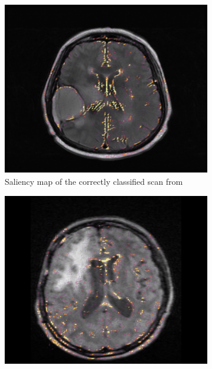 \begin{figure}[htbp]
    \begin{subfigure}[t]{0.25\textwidth}
        \centering
        \includegraphics[width=\textwidth]{Figures/FLAIR_Ivy_Saliency}
        \caption{Saliency map of the correctly classified \gls{scan} from }\label{fig:IvyGAP_FLAIR_saliency}
    \end{subfigure}
    \hfill
    \begin{subfigure}[t]{0.25\textwidth}
        \centering
        \includegraphics[width=\textwidth]{Figures/Appendix/FLAIR_RIDER_saliency}

\end{subfigure}
\end{figure}
